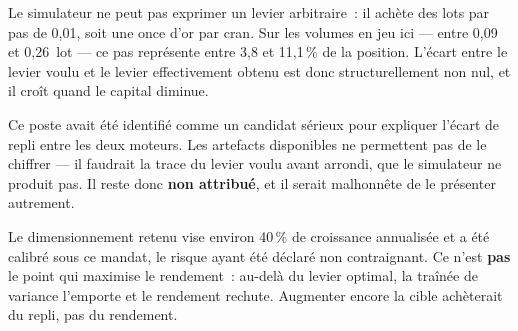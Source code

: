 Le simulateur ne peut pas exprimer un levier arbitraire~: il achète des lots
par pas de 0,01, soit une once d'or par cran. Sur les volumes en jeu ici ---
entre 0,09 et 0,26~lot --- ce pas représente entre 3,8 et 11,1\,\% de la
position. L'écart entre le levier voulu et le levier effectivement obtenu est
donc structurellement non nul, et il croît quand le capital diminue.

Ce poste avait été identifié comme un candidat sérieux pour expliquer l'écart de
repli entre les deux moteurs. Les artefacts disponibles ne permettent pas de le
chiffrer --- il faudrait la trace du levier voulu avant arrondi, que le
simulateur ne produit pas. Il reste donc \textbf{non attribué}, et il serait
malhonnête de le présenter autrement.

\begin{warningbox}
Le dimensionnement retenu vise environ 40\,\% de croissance annualisée et a été
calibré sous ce mandat, le risque ayant été déclaré non contraignant. Ce n'est
\textbf{pas} le point qui maximise le rendement~: au-delà du levier optimal, la
traînée de variance l'emporte et le rendement rechute. Augmenter encore la
cible achèterait du repli, pas du rendement.
\end{warningbox}

